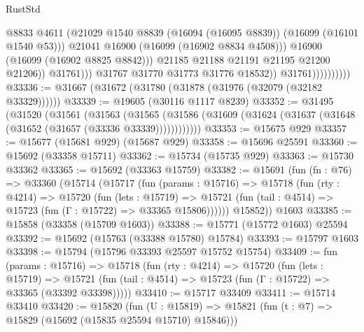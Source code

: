 \begin{lexlean}{RustStd}
\begin{coremodule}
                                          @8833
                                          @4611
                                          (@21029
                                            @1540
                                            @8839
                                            (@16094 (@16095 @8839))
                                            (@16099 (@16101 @1540 @53)))
                                          @21041
                                          @16900
                                          (@16099 (@16902 @8834 @4508)))
                                        @16900
                                        (@16099 (@16902 @8825 @8842)))
                                      @21185
                                      @21188
                                      @21191
                                      @21195
                                      @21200
                                      @21206))
                                  @31761)))
                            @31767
                            @31770
                            @31773
                            @31776
                            @18532))
                        @31761))))))))))
@33336 := @31667 (@31672 (@31780 (@31878 (@31976 (@32079 (@32182 @33329))))))
@33339 := @19605 (@30116 @1117 @8239)
@33352 := @31495
    (@31520
      (@31561
        (@31563
          (@31565 (@31586 (@31609 (@31624 (@31637 (@31648 (@31652 (@31657 (@33336 @33339))))))))))))
@33353 := @15675 @929
@33357 := @15677 (@15681 @929) (@15687 @929)
@33358 := @15696 @25591
@33360 := @15692 (@33358 @15711)
@33362 := @15734 (@15735 @929)
@33363 := @15730 @33362
@33365 := @15692 (@33363 @15759)
@33382 := @15691
    (fun (fn : @76) =>
    @33360
      (@15714
        (@15717
          (fun (params : @15716) =>
          @15718
            (fun (rty : @4214) =>
            @15720
              (fun (lets : @15719) =>
              @15721 (fun (tail : @4514) => @15723 (fun (Γ : @15722) => @33365 @15806))))))
        @15852))
    @1603
@33385 := @15858 (@33358 (@15709 @1603))
@33388 := @15771 (@15772 @1603) @25594
@33392 := @15692 (@15763 (@33388 @15780) @15784)
@33393 := @15797 @1603
@33398 := @15794 (@15796 @33393 @25597 @15752 @15754)
@33409 := fun (params : @15716) =>
  @15718
    (fun (rty : @4214) =>
    @15720
      (fun (lets : @15719) =>
      @15721 (fun (tail : @4514) => @15723 (fun (Γ : @15722) => @33365 (@33392 @33398)))))
@33410 := @15717 @33409
@33411 := @15714 @33410
@33420 := @15820
    (fun (U : @15819) => @15821 (fun (t : @7) => @15829 (@15692 (@15835 @25594 @15710) @15846)))

\end{coremodule}
\end{lexlean}
